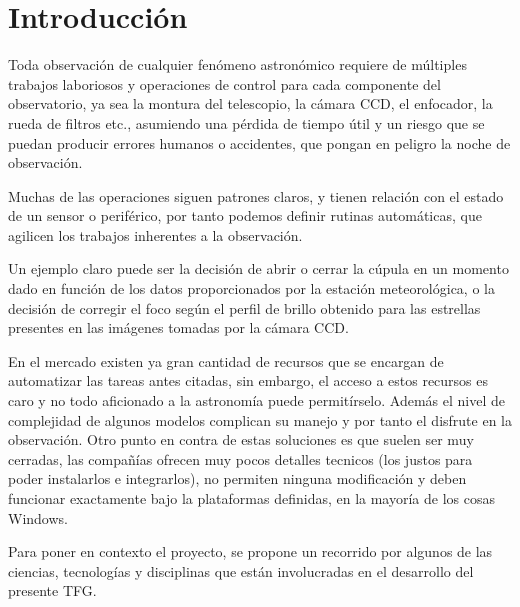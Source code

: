 \chapter{Introducción}

\bigskip
Toda observación de cualquier fenómeno astronómico requiere de múltiples trabajos laboriosos y operaciones de control para cada componente del observatorio, ya sea la montura del telescopio, la cámara CCD, el enfocador, la rueda de filtros etc., asumiendo una pérdida de tiempo útil y un riesgo que se puedan producir errores humanos o accidentes, que pongan en peligro la noche de observación.

\bigskip
Muchas de las operaciones siguen patrones claros, y tienen relación con el estado de un sensor o periférico, por tanto podemos definir rutinas automáticas, 
que agilicen los trabajos inherentes a la observación. 

\bigskip
Un ejemplo claro puede ser la decisión de abrir o cerrar la cúpula en un momento dado en función de los datos proporcionados por la estación meteorológica, o la decisión de corregir el foco según el perfil de brillo obtenido para las estrellas presentes en las imágenes tomadas por la cámara CCD.

\bigskip
En el mercado existen ya gran cantidad de recursos que se encargan de automatizar las tareas antes citadas, sin embargo, el acceso a estos recursos es caro y no todo aficionado a la astronomía puede permitírselo.  Además el nivel de complejidad de algunos modelos complican su manejo y por tanto el disfrute en la observación.
Otro punto en contra de estas soluciones es que suelen ser muy cerradas, las compañías ofrecen muy pocos detalles tecnicos (los justos para poder instalarlos e integrarlos), no permiten ninguna modificación y deben funcionar exactamente bajo la plataformas definidas, en la mayoría de los cosas Windows. 

\newpage
\bigskip
Para poner en contexto el proyecto, se  propone un recorrido por algunos de las ciencias, tecnologías y disciplinas que están involucradas en el desarrollo del presente TFG.

